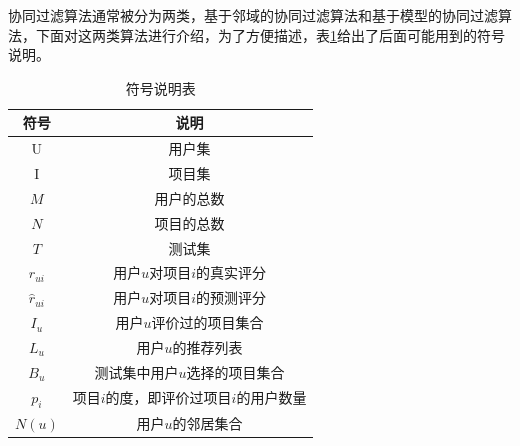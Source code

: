 \documentclass[master,winfonts]{njuthesis}
\begin{document}
协同过滤算法通常被分为两类，基于邻域的协同过滤算法和基于模型的协同过滤算法，下面对这两类算法进行介绍，为了方便描述，表\ref{table:1}给出了后面可能用到的符号说明。
\begin{table}
  \centering
  \begin{tabular}{|c|c|}
    \hline
    \textbf{符号} & \textbf{说明} \\
    \hline U  & 用户集 \\
    \hline I     &项目集   \\
    \hline $M$  & 用户的总数\\
    \hline  $N$   & 项目的总数     \\
	\hline  $T$   &测试集    \\
	\hline   $r_{ui}$  & 用户$u$对项目$i$的真实评分     \\
	\hline   $\hat{r}_{ui}$ & 用户$u$对项目$i$的预测评分     \\
	\hline    $I_u$ &用户$u$评价过的项目集合    \\
	\hline    $L_u$ &用户$u$的推荐列表    \\
	\hline    $B_u$ & 测试集中用户$u$选择的项目集合     \\
	\hline    $p_i$ & 项目$i$的度，即评价过项目$i$的用户数量\\
	\hline    $N(u)$ &用户$u$的邻居集合\\
    \hline
  \end{tabular}
  \caption{符号说明表}\label{table:1}
\end{table}
\end{document}
